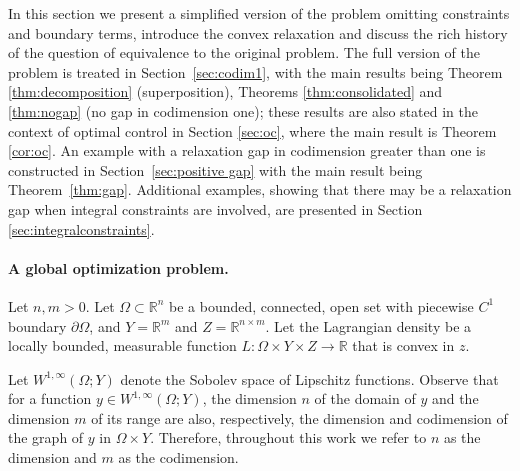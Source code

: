 \documentclass{article}
\newcommand{\R}{\mathbb{R}}
\theoremstyle{definition}
\theoremstyle{remark}
\begin{document}
%
%
%

%

%

%
%
%


%
%

In this section we present a simplified version of the problem omitting constraints and boundary terms, introduce the convex relaxation and discuss the rich history of the question of equivalence to the original problem. The full version of the problem is treated in Section~\ref{sec:codim1}, with the main results being Theorem \ref{thm:decomposition} (superposition), Theorems \ref{thm:consolidated} and \ref{thm:nogap} (no gap in codimension one); these results are also stated in the context of optimal control in Section \ref{sec:oc}, where the main result is Theorem \ref{cor:oc}. An example with a relaxation gap in codimension greater than one is constructed in Section~\ref{sec:positive gap} with the main result being Theorem~\ref{thm:gap}. Additional examples, showing that there may be a relaxation gap when integral constraints are involved, are presented in Section \ref{sec:integralconstraints}.







\paragraph{A global optimization problem.}

Let $n,m>0$. Let $\Omega\subset\R^n$ be a bounded, connected, open set with piecewise $C^1$ boundary $\partial \Omega$, and  $Y=\R^m$ and $Z=\R^{n\times m}$. Let the Lagrangian density be a locally bounded, measurable function $L\colon \Omega\times Y\times Z\to\R$ that is convex in $z$. 

Let $W^{1,\infty}(\Omega;Y)$ denote the Sobolev space of Lipschitz functions. Observe that for a function $y\in W^{1,\infty}(\Omega;Y)$, the dimension $n$ of the domain of $y$ and the dimension $m$ of its range are also, respectively, the dimension and codimension of the graph of $y$ in $\Omega\times Y$. Therefore, throughout this work we refer to $n$ as the dimension and $m$ as the codimension.
%
\end{document}
